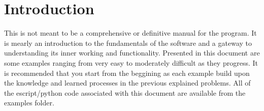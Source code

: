 
%
%
%

\section{Introduction}

\begin{editor}
This is not meant to be a comprehensive or definitive manual for the \esc  program. It is mearly an introduction to the fundamentals of the software and a gateway to understanding its inner working and functionality.
Presented in this document are some examples ranging from very easy to moderately difficult as they progress.
It is recommended that you start from the beggining as each example build upon the knowledge and learned processes in the previous explained problems.
All of the escript/python code associated with this document are available from the examples folder.
\end{editor}

